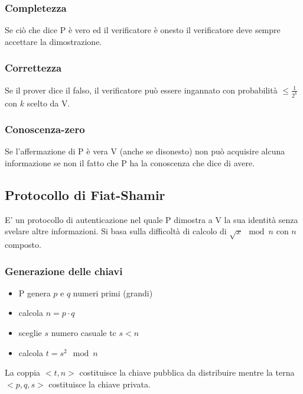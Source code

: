 \subsubsection{Completezza}
Se ciò che dice P è vero ed il verificatore è onesto il verificatore deve sempre accettare la dimostrazione.
\subsubsection{Correttezza}
Se il prover dice il falso, il verificatore può essere ingannato con probabilità $\leq \frac{1}{2^k}$ con $k$ scelto da V.
\subsubsection{Conoscenza-zero}
Se l'affermazione di P è vera V (anche se disonesto) non può acquisire alcuna informazione se non il fatto che P ha la conoscenza che dice di avere.

\subsection{Protocollo di Fiat-Shamir}
E' un protocollo di autenticazione nel quale P dimostra a V la sua identità senza svelare altre informazioni. Si basa sulla difficoltà di calcolo di $\sqrt{x} \mod n$ con $n$ composto. 

\subsubsection{Generazione delle chiavi}
\begin{itemize}
    \item P genera $p$ e $q$ numeri primi (grandi)
    \item calcola $n = p \cdot q$
    \item sceglie $s$ numero casuale tc $s < n$
    \item calcola $t = s^2 \mod n$
\end{itemize}
La coppia $<t,n>$ costituisce la chiave pubblica da distribuire mentre la terna $<p, q, s>$ costituisce la chiave privata.

